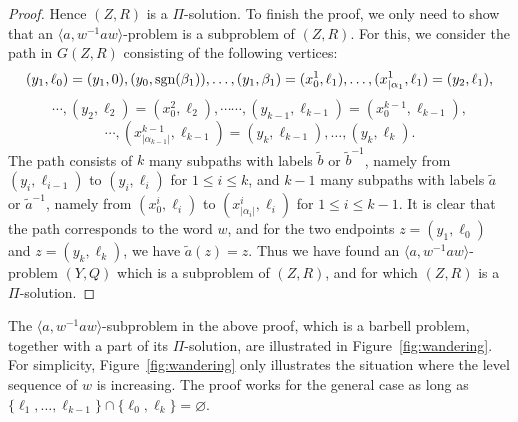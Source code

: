 \documentclass[11pt]{amsart}
\theoremstyle{definition}
\theoremstyle{definition}
\numberwithin{equation}{section}
\begin{document}
\begin{proof}
Hence $(Z,R)$ is a $\Pi$-solution. To finish the proof, we only need to show that an $\langle a, w^{-1}aw\rangle$-problem is a subproblem of $(Z,R)$. For this, we consider the path in $G(Z,R)$ consisting of the following vertices:
$$ (y_1, \ell_0)=(y_1, 0), (y_0, \mbox{\rm sgn}(\beta_1)), \dots, (y_1, \beta_1)=(x^1_0, \ell_1), \dots, (x^1_{|\alpha_1}, \ell_1)=(y_2, \ell_1), $$
$$ \cdots, (y_2, \ell_2)=(x^2_0, \ell_2),  \cdots\cdots, (y_{k-1}, \ell_{k-1})=(x^{k-1}_0, \ell_{k-1}), $$
$$ \cdots, (x^{k-1}_{|\alpha_{k-1}|}, \ell_{k-1})=(y_k, \ell_{k-1}), \dots, (y_k, \ell_k). $$
The path consists of $k$ many subpaths with labels $\tilde{b}$ or $\tilde{b}^{-1}$, namely from $(y_i, \ell_{i-1})$ to $(y_i, \ell_i)$ for $1\leq i\leq k$, and $k-1$ many subpaths with labels $\tilde{a}$ or $\tilde{a}^{-1}$, namely from $(x^i_0, \ell_i)$ to $(x^i_{|\alpha_i|}, \ell_i)$ for $1\leq i\leq k-1$. It is clear that the path corresponds to the word $w$, and for the two endpoints $z=(y_1, \ell_0)$ and $z=(y_k, \ell_k)$, we have $\tilde{a}(z)=z$. Thus we have found an $\langle a, w^{-1}aw\rangle$-problem $(Y,Q)$ which is a subproblem of $(Z,R)$, and for which $(Z,R)$ is a $\Pi$-solution.
\end{proof}

The $\langle a, w^{-1}aw\rangle$-subproblem in the above proof, which is a barbell problem,  together with a part of its $\Pi$-solution, are illustrated in Figure~\ref{fig:wandering}. For simplicity, Figure~\ref{fig:wandering} only illustrates the situation where the level sequence of $w$ is increasing. The proof works for the general case as long as $\{\ell_1,\dots, \ell_{k-1}\}\cap \{\ell_0, \ell_k\}=\varnothing$.
\end{document}
